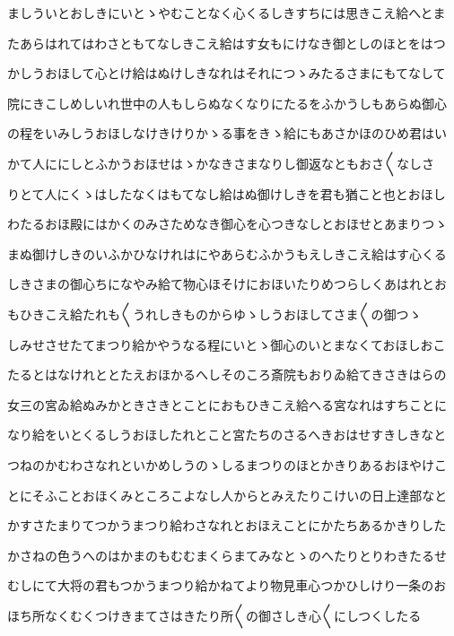 \documentclass[a4paper,11pt,landscape]{ltjtarticle}
\begin{document}
\par\medskip
ましういとおしきにいとゝやむことなく心くるしきすちには思きこえ給へとま
\par\medskip
たあらはれてはわさともてなしきこえ給はす女もにけなき御としのほとをはつ
\par\medskip
かしうおほして心とけ給はぬけしきなれはそれにつゝみたるさまにもてなして
\par\medskip
院にきこしめしいれ世中の人もしらぬなくなりにたるをふかうしもあらぬ御心
\par\medskip
の程をいみしうおほしなけきけりかゝる事をきゝ給にもあさかほのひめ君はい
\par\medskip
かて人ににしとふかうおほせはゝかなきさまなりし御返なともおさ〱なしさ
\par\medskip
りとて人にくゝはしたなくはもてなし給はぬ御けしきを君も猶こと也とおほし
\par\medskip
わたるおほ殿にはかくのみさためなき御心を心つきなしとおほせとあまりつゝ
\par\medskip
まぬ御けしきのいふかひなけれはにやあらむふかうもえしきこえ給はす心くる
\par\medskip
しきさまの御心ちになやみ給て物心ほそけにおほいたりめつらしくあはれとお
\par\medskip
もひきこえ給たれも〱うれしきものからゆゝしうおほしてさま〱の御つゝ
\par\medskip
しみせさせたてまつり給かやうなる程にいとゝ御心のいとまなくておほしおこ
\par\medskip
たるとはなけれととたえおほかるへしそのころ斎院もおりゐ給てきさきはらの
\par\medskip
女三の宮ゐ給ぬみかときさきとことにおもひきこえ給へる宮なれはすちことに
\par\medskip
なり給をいとくるしうおほしたれとこと宮たちのさるへきおはせすきしきなと
\par\medskip
つねのかむわさなれといかめしうのゝしるまつりのほとかきりあるおほやけこ
\par\medskip
とにそふことおほくみところこよなし人からとみえたりこけいの日上達部なと
\par\medskip
かすさたまりてつかうまつり給わさなれとおほえことにかたちあるかきりした
\par\medskip
かさねの色うへのはかまのもむむまくらまてみなとゝのへたりとりわきたるせ
\par\medskip
むしにて大将の君もつかうまつり給かねてより物見車心つかひしけり一条のお
\par\medskip
ほち所なくむくつけきまてさはきたり所〱の御さしき心〱にしつくしたる
\par\medskip
\end{document}
